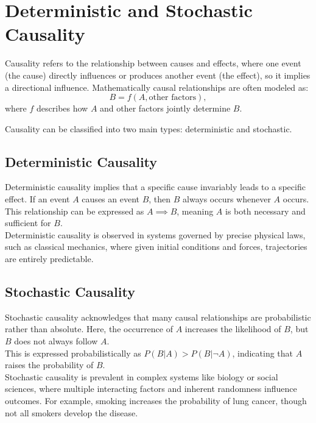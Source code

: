 \documentclass[English, Lau, oneside]{sapthesis}
\begin{document}
\newpage
\section{Deterministic and Stochastic Causality}
\noindent Causality refers to the relationship between causes and effects, where one event (the cause) directly influences or produces another event (the effect), so it implies a directional influence.
Mathematically causal relationships are often modeled as:\cite{ref14}
\[
B = f(A, \text{other factors}),
\]
where \( f \) describes how \( A \) and other factors jointly determine \( B \). 


Causality can be classified into two main types: deterministic and stochastic.

\subsection{Deterministic Causality}

\noindent Deterministic causality implies that a specific cause invariably leads to a specific effect. If an event \( A \) causes an event \( B \), then \( B \) always occurs whenever \( A \) occurs. \\
This relationship can be expressed as \( A \implies B \), meaning \( A \) is both necessary and sufficient for \( B \). \\
Deterministic causality is observed in systems governed by precise physical laws, such as classical mechanics, where given initial conditions and forces, trajectories are entirely predictable.

\subsection{Stochastic Causality}

\noindent Stochastic causality acknowledges that many causal relationships are probabilistic rather than absolute. 
Here, the occurrence of \( A \) increases the likelihood of \( B \), but \( B \) does not always follow \( A \). \\
This is expressed probabilistically as \( P(B|A) > P(B|\neg A) \), indicating that \( A \) raises the probability of \( B \). \\
Stochastic causality is prevalent in complex systems like biology or social sciences, where multiple interacting factors and inherent randomness influence outcomes. 
For example, smoking increases the probability of lung cancer, though not all smokers develop the disease.
\end{document}
